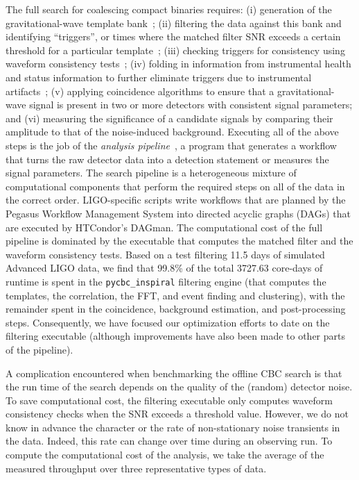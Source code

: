 The full search for coalescing compact binaries requires: (i) generation of the
gravitational-wave template bank~\cite{Babak:2006ty,Brown:2012qf}; (ii) filtering
the data against this bank and identifying ``triggers'', or times where the
matched filter \ac{SNR} exceeds a certain threshold for a
particular template~\cite{Allen:2005fk}; (iii) checking triggers for consistency
using waveform consistency tests~\cite{Allen:2004}; (iv) folding in
information from instrumental health and status information to further
eliminate triggers due to instrumental
artifacts~\cite{Slutsky:2010ff,Aasi:2012wd-2}; (v) applying coincidence algorithms
to ensure that a gravitational-wave signal is present in two or more detectors
with consistent signal parameters; and (vi) measuring the significance of a
candidate signals by comparing their amplitude to that of the noise-induced
background.   Executing all of the above steps is the job of the \emph{analysis
pipeline}~\cite{Babak:2012zx,Brown:workflow}, a program that generates a
workflow that turns the raw detector data into a detection statement or
measures the signal parameters. The search pipeline is a heterogeneous mixture
of computational components that perform the required steps on all of the data
in the correct order. LIGO-specific scripts write workflows that are planned
by the Pegasus Workflow Management System into directed acyclic graphs (DAGs) that are executed by
HTCondor's DAGman. 
The computational cost of the full pipeline is dominated by the executable that
computes the matched filter and the waveform consistency tests. Based on a test
filtering 11.5 days of simulated Advanced LIGO data, we find that 99.8\% of the total 3727.63 core-days of runtime is spent in the \texttt{pycbc\_inspiral} filtering engine (that computes the templates, the correlation, the FFT, and event finding and clustering), with the remainder spent in the
coincidence, background estimation, and post-processing steps. Consequently,
we have focused our optimization efforts to date on the filtering executable
(although improvements have also been made to other parts of the pipeline).

A complication encountered when
benchmarking the offline CBC search is that the run time of the search  depends on the quality
of the (random) detector noise. To save computational cost, the filtering
executable only computes waveform consistency checks when the \ac{SNR} exceeds
a threshold value. However, we do not know in advance the character or the
rate of non-stationary noise transients in the data. Indeed, this rate can
change over time during an observing run.  To compute the computational cost
of the analysis, we take the average of the measured throughput over three
representative types of data. 

